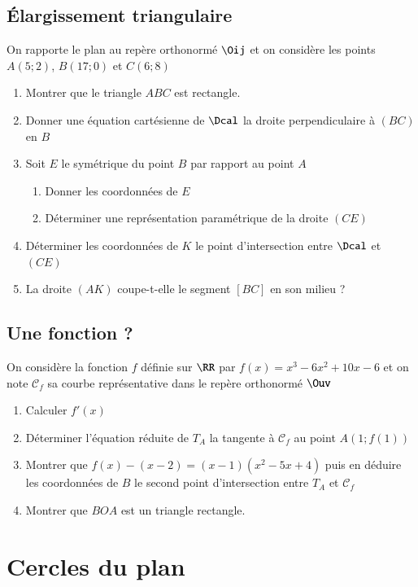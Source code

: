 \documentclass[oneside,12pt]{article}          %
\begin{document}
\subsection{Élargissement triangulaire}
On rapporte le plan au repère orthonormé $\Oij$ et on considère les points $A(5;2)$, $B(17;0)$ et $C(6;8)$
\begin{enumerate}
    \item Montrer que le triangle $ABC$ est rectangle.
    \item Donner une équation cartésienne de $\Dcal$ la droite perpendiculaire à $(BC)$ en $B$
    \item Soit $E$ le symétrique du point $B$ par rapport au point $A$
    \begin{enumerate}
        \item Donner les coordonnées de $E$
        \item Déterminer une représentation paramétrique de la droite $(CE)$
    \end{enumerate}
    \item Déterminer les coordonnées de $K$ le point d'intersection entre $\Dcal$ et $(CE)$
    \item La droite $(AK)$ coupe-t-elle le segment $[BC]$ en son milieu ?
\end{enumerate}



\subsection{Une fonction ?}
 On considère la fonction $f$ définie sur $\RR$ par $f(x)=x^{3}-6x^{2}+10x-6 $ et on note $\mathscr{C}_{f}$ sa courbe représentative dans le repère orthonormé $\Ouv$
\begin{enumerate}
    \item Calculer $f'(x)$
    \item Déterminer l'équation réduite de $T_{A}$ la tangente à $\mathscr{C}_{f}$ au point $A(1;f(1))$
    \item Montrer que $f(x)-(x-2) = (x-1)(x^{2}-5x+4) $ puis en déduire les coordonnées de $B$ le second point d'intersection entre $T_{A}$ et $\mathscr{C}_{f}$
    \item Montrer que $BOA$ est un triangle rectangle.
\end{enumerate}



\section{Cercles du plan}
\end{document}
